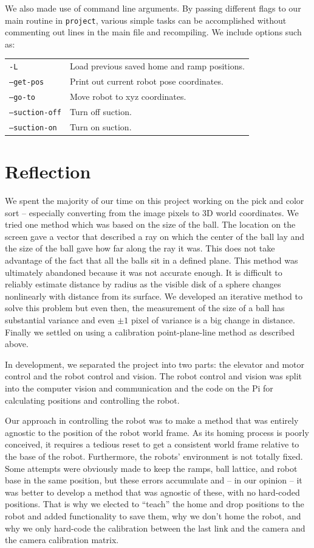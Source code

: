\documentclass{article}
\begin{document}
We also made use of command line arguments. By passing different flags to our main routine in \texttt{project}, various simple tasks can be accomplished without commenting out lines in the main file and recompiling. We include options such as:

\begin{tabular}{ll}
	\texttt{-L} & Load previous saved home and ramp positions.\\
	\texttt{--get-pos} & Print out current robot pose coordinates. \\
	\texttt{--go-to} & Move robot to xyz coordinates. \\
	\texttt{--suction-off} & Turn off suction. \\
	\texttt{--suction-on} & Turn on suction. \\
\end{tabular}

\section{Reflection}
We spent the majority of our time on this project working on the pick and color sort -- especially converting from the image pixels to 3D world coordinates. We tried one method which was based on the size of the ball. The location on the screen gave a vector that described a ray on which the center of the ball lay and the size of the ball gave how far along the ray it was. This does not take advantage of the fact that all the balls sit in a defined plane. This method was ultimately abandoned because it was not accurate enough. It is difficult to reliably estimate distance by radius as the visible disk of a sphere changes nonlinearly with distance from its surface. We developed an iterative method to solve this problem but even then, the measurement of the size of a ball has substantial variance and even $\pm 1$ pixel of variance is a big change in distance. Finally we settled on using a calibration point-plane-line method as described above.

In development, we separated the project into two parts: the elevator and motor control and the robot control and vision. The robot control and vision was split into the computer vision and communication and the code on the Pi for calculating positions and controlling the robot.

Our approach in controlling the robot was to make a method that was entirely agnostic to the position of the robot world frame. As its homing process is poorly conceived, it requires a tedious reset to get a consistent world frame relative to the base of the robot. Furthermore, the robots' environment is not totally fixed. Some attempts were obviously made to keep the ramps, ball lattice, and robot base in the same position, but these errors accumulate and -- in our opinion -- it was better to develop a method that was agnostic of these, with no hard-coded positions. That is why we elected to ``teach'' the home and drop positions to the robot and added functionality to save them, why we don't home the robot, and why we only hard-code the calibration between the last link and the camera and the camera calibration matrix.
\end{document}

